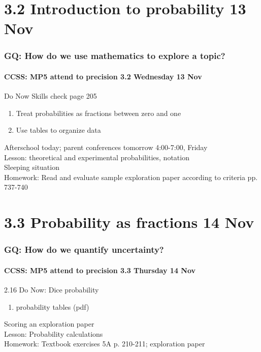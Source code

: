 \documentclass{beamer}
\begin{document}
\section{3.2 Introduction to probability 13 Nov}
\frame
{
  \frametitle{GQ: How do we use mathematics to explore a topic?}
  \framesubtitle{CCSS: MP5 attend to precision \hfill \alert{3.2 Wednesday 13 Nov}}

  \begin{block}{Do Now Skills check page 205}
  \begin{enumerate}
      \item Treat probabilities as fractions between zero and one 
      \item Use tables to organize data
  \end{enumerate}
  \end{block}
  Afterschool today; parent conferences tomorrow 4:00-7:00, Friday\\ \smallskip
  Lesson: theoretical and experimental probabilities, notation \\
  Sleeping situation\\ \smallskip
  Homework: Read and evaluate sample exploration paper according to criteria pp. 737-740
}

\section{3.3 Probability as fractions 14 Nov}
\frame
{
  \frametitle{GQ: How do we quantify uncertainty?}
  \framesubtitle{CCSS: MP5 attend to precision \hfill \alert{3.3 Thursday 14 Nov}}

  \begin{block}{2.16 Do Now: Dice probability}
  \begin{enumerate}
      \item probability tables (pdf)
  \end{enumerate}
  \end{block}
  Scoring an exploration paper \\
  Lesson: Probability calculations \\ \smallskip
  Homework: Textbook exercises 5A p. 210-211; exploration paper
}
\end{document}
